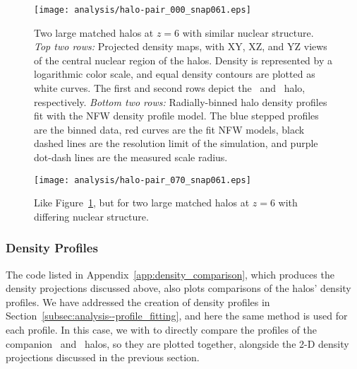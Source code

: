 \begin{figure}[t]
	\centering
	\texttt{[image: analysis/halo-pair\_000\_snap061.eps]}
	\caption[Comparison of two large well-fit companion halos $z = 6$.]{\footnotesize Two large matched halos at $z = 6$ with similar nuclear structure.  \emph{Top two rows:}  Projected density maps, with XY, XZ, and YZ views of the central nuclear region of the halos.  Density is represented by a logarithmic color scale, and equal density contours are plotted as white curves.  The first and second rows depict the \lpt\ and \za\ halo, respectively.  \emph{Bottom two rows:}  Radially-binned halo density profiles fit with the NFW density profile model.  The blue stepped profiles are the binned data, red curves are the fit NFW models, black dashed lines are the resolution limit of the simulation, and purple dot-dash lines are the measured scale radius.}
	\label{fig:density_comparison_000}
\end{figure}

\begin{figure}[t]
	\centering
	\texttt{[image: analysis/halo-pair\_070\_snap061.eps]}
	\caption[Comparison of two large companion halos $z = 6$ with differing nuclear structure.]{\footnotesize Like Figure~\ref{fig:density_comparison_000}, but for two large matched halos at $z = 6$ with differing nuclear structure.}
	\label{fig:density_comparison_070}
\end{figure}



\subsubsection{Density Profiles}
\label{subsubsec:analysis--halo_comparison--density_profiles}


The code listed in Appendix~\ref{app:density_comparison}, which produces the density projections discussed above, also plots comparisons of the halos' density profiles.  We have addressed the creation of density profiles in Section~\ref{subsec:analysis--profile_fitting}, and here the same method is used for each profile.  In this case, we with to directly compare the profiles of the companion \lpt\ and \za\ halos, so they are plotted together, alongside the 2-D density projections discussed in the previous section.

